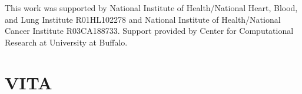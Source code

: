 \documentclass[]{DissertateOSU}
\begin{document}
This work was supported by National Institute of Health/National Heart,
Blood, and Lung Institute R01HL102278 and National Institute of
Health/National Cancer Institute R03CA188733. Support provided by Center
for Computational Research at University at Buffalo.

\newpage

\pagestyle{plain} \fancyhead[L]{} \fancyhead[R]{}
\fancyfoot[C]{\thepage} \chapter*{VITA}
 \singlespacing

 
\end{document}
